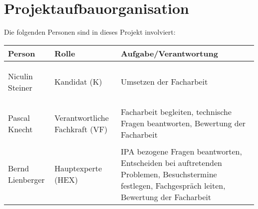 \chapter{Projektaufbauorganisation}\label{ch:projektaufbauorganisation}

Die folgenden Personen sind in dieses Projekt involviert:
\renewcommand{\arraystretch}{1.5}
\begin{longtable}{|p{}|p{}|p{}|}
    \hline
    \textbf{Person}                 & \textbf{Rolle}                 & \textbf{Aufgabe/Verantwortung}                                                                                                                   \\
    \hline
    \hypertarget{k}{Niculin Steiner}         & Kandidat (K)                   & Umsetzen der Facharbeit                                                                                                                          \\
    \hline

    \hypertarget{vf}{Pascal Knecht}     & Verantwortliche Fachkraft (VF) & Facharbeit begleiten, technische Fragen beantworten, Bewertung der Facharbeit                                                                    \\
    \hline

    \hypertarget{hex}{Bernd Lienberger}      & Hauptexperte (HEX)             & IPA bezogene Fragen beantworten, Entscheiden bei auftretenden Problemen, Besuchstermine festlegen, Fachgespräch leiten, Bewertung der Facharbeit \\
    \hline
\end{longtable}
\renewcommand{\arraystretch}{1}
